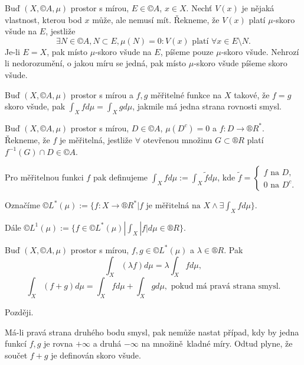 \documentclass[12pt]{article}					%
\begin{document}
\begin{definice}
	Buď $(X, ©A, \mu)$ prostor s mírou, $E \in ©A$, $x \in X$. Nechť $V(x)$ je nějaká vlastnost, kterou bod $x$ může, ale nemusí mít. Řekneme, že $V(x)$ platí $\mu$-skoro všude na $E$, jestliže
	$$ \exists N \in ©A, N \subset E, \mu(N) = 0: V(x) \text{ platí } \forall x \in E \setminus N. $$
	Je-li $E = X$, pak místo $\mu$-skoro všude na $E$, píšeme pouze $\mu$-skoro všude. Nehrozí li nedorozumění, o jakou míru se jedná, pak místo $\mu$-skoro všude píšeme skoro všude.
\end{definice}

\begin{lemma}
	Buď $(X, ©A, \mu)$ prostor s mírou a $f, g$ měřitelné funkce na $X$ takové, že $f = g$ skoro všude, pak $\int_X fd\mu = \int_X g d\mu$, jakmile má jedna strana rovnosti smysl.
\end{lemma}

\begin{definice}
	Buď $(X, ©A, \mu)$ prostor s mírou, $D \in ©A$, $\mu(D^c) = 0$ a $f: D \rightarrow ®R^*$. Řekneme, že $f$ je měřitelná, jestliže $\forall$ otevřenou množinu $G \subset ®R$ platí $f^{-1}(G) \cap D \in ©A$.

	Pro měřitelnou funkci $f$ pak definujeme $\int_X f d\mu := \int_X \tilde{f} d\mu$, kde $\tilde{f} = \begin{cases} f \text{ na } D, \\ 0 \text{ na } D^c. \end{cases}$
\end{definice}

\begin{definice}[Prostory ©L]
	Označíme $©L^*(\mu) := \{f:X \rightarrow ®R^* | f \text{ je měřitelná na } X \land \exists \int_X f d\mu\}$.

	Dále $©L^1(\mu) := \{f \in ©L^*(\mu) | \int_X |f| d\mu \in ®R\}$.
\end{definice}

\begin{veta}
	Buď $(X, ©A, \mu)$ prostor s mírou, $f, g \in ©L^*(\mu)$ a $\lambda \in ®R$. Pak
	$$ \int_X (\lambda f) d\mu = \lambda\int_X f d\mu, $$
	$$ \int_X (f+g) d\mu = \int_X f d\mu + \int_X g d\mu, \text{ pokud má pravá strana smysl.} $$

	\begin{dukazin}
		Později.
	\end{dukazin}

	\begin{poznamkain}
		Má-li pravá strana druhého bodu smysl, pak nemůže nastat případ, kdy by jedna funkcí $f, g$ je rovna $+∞$ a druhá $-∞$ na množině kladné míry. Odtud plyne, že součet $f+g$ je definován skoro všude.
	\end{poznamkain}
\end{veta}
\end{document}
